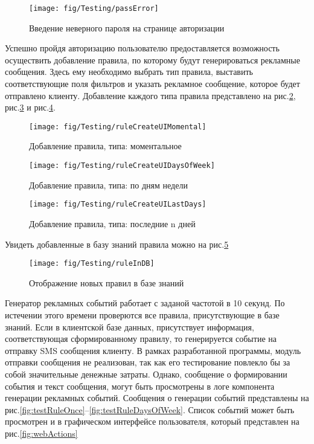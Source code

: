 \begin{figure}[h]
	\centering
	\texttt{[image: fig/Testing/passError]}
	\caption{Введение неверного пароля на странице авторизации}
	\label{fig:passError}
\end{figure}

Успешно пройдя авторизацию пользователю предоставляется возможность осуществить добавление правила, по которому будут генерироваться рекламные сообщения. Здесь ему необходимо выбрать тип правила, выставить соответствующие поля фильтров и указать рекламное сообщение, которое будет отправлено клиенту. Добавление каждого типа правила представлено на рис.\ref{fig:ruleCreateUIMomental}, рис.\ref{fig:ruleCreateUIDaysOfWeek} и рис.\ref{fig:ruleCreateUILastDays}.

\begin{figure}[h]
	\centering
	\texttt{[image: fig/Testing/ruleCreateUIMomental]}
	\caption{Добавление правила, типа: моментальное}
	\label{fig:ruleCreateUIMomental}
\end{figure}

\begin{figure}[h]
	\centering
	\texttt{[image: fig/Testing/ruleCreateUIDaysOfWeek]}
	\caption{Добавление правила, типа: по дням недели}
	\label{fig:ruleCreateUIDaysOfWeek}
\end{figure}

\begin{figure}[h]
	\centering
	\texttt{[image: fig/Testing/ruleCreateUILastDays]}
	\caption{Добавление правила, типа: последние n дней}
	\label{fig:ruleCreateUILastDays}
\end{figure}

Увидеть добавленные в базу знаний правила можно на рис.\ref{fig:ruleInDB}

\begin{figure}[h]
	\centering
	\texttt{[image: fig/Testing/ruleInDB]}
	\caption{Отображение новых правил в базе знаний}
	\label{fig:ruleInDB}
\end{figure}

Генератор рекламных событий работает с заданой частотой в 10 секунд. По истечении этого времени проверются все правила, присутствующие в базе знаний. Если в клиентской базе данных, присутствует информация, соответствующая сформированному правилу, то генерируется событие на отправку SMS сообщения клиенту. В рамках разработанной программы, модуль отправки сообщения не реализован, так как его тестирование повлекло бы за собой значительные денежные затраты. Однако, сообщение о формировании события и текст сообщения, могут быть просмотрены в логе компонента генерации рекламных событий. Сообщения о генерации событий представлены на рис.\ref{fig:testRuleOnce}--\ref{fig:testRuleDaysOfWeek}. Список событий может быть просмотрен и в графическом интерфейсе пользователя, который представлен на рис.\ref{fig:webActions}

